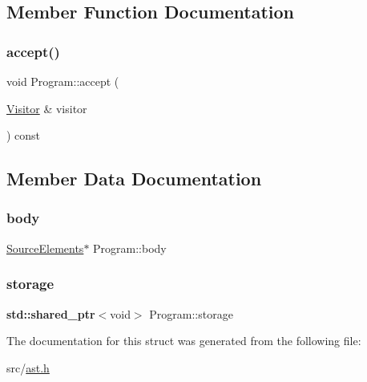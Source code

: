 \subsection{Member Function Documentation}
\mbox{\label{struct_program_afbd3eb6a94760e56c25492ea1dc685ed}} 
\subsubsection{\texorpdfstring{accept()}{accept()}}
{\footnotesize\ttfamily void Program\+::accept (\begin{DoxyParamCaption}\item[{\hyperlink{struct_visitor}{Visitor} \&}]{visitor }\end{DoxyParamCaption}) const\hspace{0.3cm}{\ttfamily [inline]}}



\subsection{Member Data Documentation}
\mbox{\label{struct_program_a5a4db26ab169d8e65def12c02f5af6e5}} 
\subsubsection{\texorpdfstring{body}{body}}
{\footnotesize\ttfamily \hyperlink{struct_source_elements}{Source\+Elements}$\ast$ Program\+::body}

\mbox{\label{struct_program_aa25d5746067ab06823bf867e89dc8785}} 
\subsubsection{\texorpdfstring{storage}{storage}}
{\footnotesize\ttfamily \textbf{ std\+::shared\+\_\+ptr}$<$void$>$ Program\+::storage}



The documentation for this struct was generated from the following file\+:\begin{DoxyCompactItemize}
\item 
src/\hyperlink{ast_8h}{ast.\+h}\end{DoxyCompactItemize}
